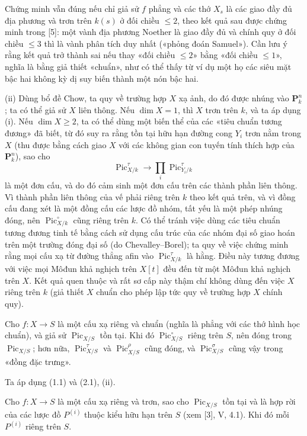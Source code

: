  Chứng minh vẫn đúng nếu chỉ giả sử $f$ phẳng và các thớ
$X_s$ là các giao đầy đủ địa phương và trơn trên $k(s)$ ở đối chiều $\leq2$,
theo kết quả sau được chứng minh trong [5]: một vành địa phương Noether là giao
đầy đủ và chính quy ở đối chiều $\leq3$ thì là vành phân tích duy nhất («phỏng
đoán Samuel»). Cần lưu ý rằng
kết quả trở thành sai nếu thay «đối chiều $\leq2$» bằng «đối chiều
$\leq1$», nghĩa là bằng giả thiết «chuẩn», như có thể thấy từ ví dụ một họ các
siêu mặt bậc hai không kỳ dị suy biến thành một nón bậc hai.

(ii) Dùng bổ đề Chow, ta quy về trường hợp $X$ xạ ảnh, do đó được nhúng vào
$\mathbf P_k^n$; ta có thể giả sử $X$ liên thông. Nếu $\dim X=1$, thì $X$ trơn
trên $k$, và ta áp dụng (i). Nếu $\dim X\geq2$, ta có thể dùng một biến thể của
các «tiêu chuẩn tương đương» đã biết, từ đó suy ra rằng tồn tại hữu hạn đường
cong $Y_i$ trơn nằm trong $X$ (thu được bằng cách giao $X$ với các không gian
con tuyến tính thích hợp của $\mathbf P_k^n$), sao cho
\[
\operatorname{Pic}_{X/k}^\tau\longrightarrow
\prod_i\operatorname{Pic}_{Y_i/k}^\tau
\]
là một đơn cấu, và do đó cảm sinh một đơn cấu trên các thành phần liên thông.
Vì thành phần liên thông của vế phải riêng trên $k$ theo kết quả trên, và vì
đồng cấu đang xét là một đồng cấu các lược đồ nhóm, tất yếu là một phép nhúng
đóng, nên $\operatorname{Pic}_{X/k}^\circ$ cũng riêng trên $k$. Có thể tránh
việc dùng các tiêu chuẩn tương đương tinh tế bằng cách sử dụng cấu trúc của các
nhóm đại số giao hoán trên một trường đóng đại số (do Chevalley--Borel); ta quy
về việc chứng minh rằng mọi cấu xạ từ đường thẳng afin vào
$\operatorname{Pic}_{X/k}^\tau$ là hằng. Điều này tương đương với việc mọi
Môđun khả nghịch trên $X[t]$ đều đến từ một Môđun khả
nghịch trên $X$. Kết quả quen thuộc và rất sơ cấp này thậm chí không dùng đến
việc $X$ riêng trên $k$ (giả thiết $X$ chuẩn cho phép lập tức quy về trường hợp
$X$ chính quy).

 Cho $f:X\longrightarrow S$ là một cấu xạ riêng và chuẩn
(nghĩa là phẳng với các thớ hình học chuẩn), và giả sử
$\operatorname{Pic}_{X/S}$ tồn tại. Khi đó $\operatorname{Pic}_{X/S}^\circ$
riêng trên $S$, nên đóng trong $\operatorname{Pic}_{X/S}$; hơn nữa,
$\operatorname{Pic}_{X/S}^\tau$ và $\operatorname{Pic}_{X/S}^\rho$ cũng đóng,
và $\operatorname{Pic}_{X/S}^\sigma$ cũng vậy trong «đồng đặc trưng».

Ta áp dụng (1.1) và (2.1), (ii).

 Cho $f:X\longrightarrow S$ là một cấu xạ riêng và trơn,
sao cho $\operatorname{Pic}_{X/S}$ tồn tại và là hợp rời của các lược đồ
$P^{(i)}$ thuộc kiểu hữu hạn trên $S$ (xem [3], V, 4.1). Khi đó mỗi $P^{(i)}$
riêng trên $S$.

